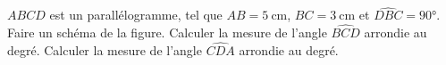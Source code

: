 \documentclass["../Cours.tex"]{subfiles}
\begin{document}
\begin{questions}
    \exercice $ABCD$ est un parallélogramme, tel que $AB=\qty{5}{\centi\metre}$, $BC=\qty{3}{\centi\metre}$ et $\widehat{DBC}=\ang{90}$.
    \question Faire un schéma de la figure.
    \question Calculer la mesure de l'angle $\widehat{BCD}$ arrondie au degré.
    \question Calculer la mesure de l'angle $\widehat{CDA}$ arrondie au degré.
\end{questions}
\end{document}
